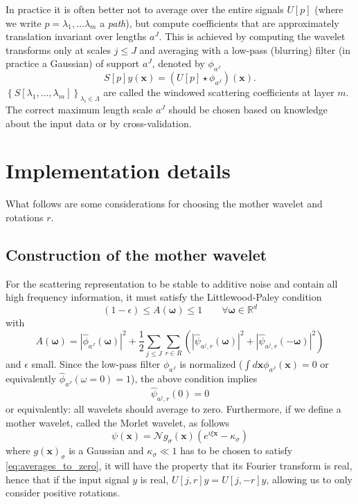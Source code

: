 \documentclass[twocolumn, openany, oneside, article]{memoir}
\begin{document}
In practice it is often better not to average over the entire signals $U[p]$ (where we write $p = \lambda_1, \dots
\lambda_m$ a \emph{path}), but compute coefficients that are approximately translation invariant over lengths $a^J$.
This is achieved by computing the wavelet transforms only at scales $j \leq J$ and averaging with a low-pass (blurring) filter (in
practice a Gaussian) of support $a^J$, denoted by $\phi_{a^J}$
\begin{equation}
  S[p]y(\bm{x}) = (U[p] \star \phi_{a^J})(\bm{x}).
\end{equation}
$\left\{ S[\lambda_1, \dots, \lambda_m] \right\}_{\lambda_i \in \Lambda}$ are called the windowed scattering
coefficients at layer $m$. The correct maximum length scale $a^J$ should be chosen based on knowledge about the input
data or by cross-validation.

\chapter{Implementation details}
What follows are some considerations for choosing the mother wavelet and
rotations $r$.

\section{Construction of the mother wavelet}

For the scattering representation to be stable to additive noise and contain all
high frequency information, it must satisfy the Littlewood-Paley condition
\begin{equation}\label{eq:lp_condition}
  (1 - \epsilon) \leq A(\bm{\omega}) \leq 1 \qquad \forall \bm{\omega} \in \mathbb{R}^d
\end{equation}
with
\begin{equation}
  A(\bm{\omega}) = \left| \hat{\phi}_{a^J}(\bm{\omega}) \right|^2 + \frac{1}{2} \sum_{j \leq J} \sum_{r \in R}
  \left( \left| \hat{\psi}_{a^j, r}(\bm{\omega}) \right|^2 + \left| \hat{\psi}_{a^j, r}(\bm{-\omega}) \right|^2 \right)
\end{equation}
and $\epsilon$ small. Since the low-pass filter $\phi_{a^J}$ is normalized ($\int d\bm{x} \phi_{a^J}(\bm{x}) = 0$ or
equivalently $\hat{\phi}_{a^J}(\omega = 0) = 1$), the above condition implies
\begin{equation}\label{eq:averages_to_zero} \hat{\psi}_{a^j, r}(0) = 0 \end{equation} or equivalently: all wavelets
should average to zero.
Furthermore, if we define a mother wavelet, called the Morlet wavelet, as follows
\begin{equation}
  \psi(\bm{x}) = \mathcal{N} g_{\sigma}(\bm{x})\left( e^{i \xi \bm{x}} - \kappa_{\sigma} \right)
\end{equation}
where $g(\bm{x})_{\sigma}$ is a Gaussian and $\kappa_{\sigma} \ll 1$ has to be chosen to satisfy
\autoref{eq:averages_to_zero}, it will have the property that its Fourier transform is real, hence that if the input
signal $y$ is real, $U[j, r]y = U[j, -r]y$, allowing us to only consider positive rotations.
\end{document}

